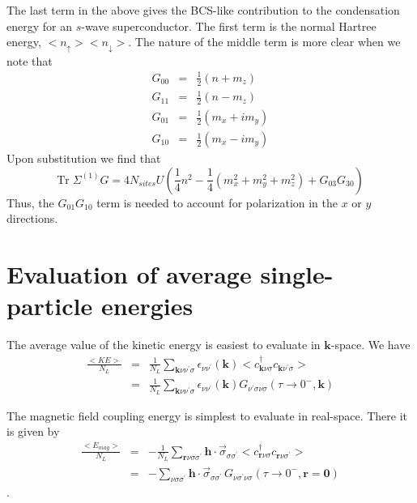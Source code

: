 The last term in the above gives the BCS-like contribution to
the condensation energy for an $s$-wave superconductor.  The 
first term is the normal Hartree energy, $<n_{\uparrow}><n_{\downarrow}>$.
The nature of the middle term is more clear when we note that
\begin{eqnarray}
G_{00} & = & \frac{1}{2}( n + m_z) \\
G_{11} & = & \frac{1}{2}( n - m_z) \\
G_{01} & = & \frac{1}{2}( m_x + i m_y) \\
G_{10} & = & \frac{1}{2}( m_x - i m_y)
\end{eqnarray}
Upon substitution we find that
\begin{equation}
\mathrm{Tr}\; \Sigma^{(1)} G = 4 N_{sites} U 
\left( \frac{1}{4} n^2 - \frac{1}{4}(m_x^2 + m_y^2 + m_z^2)
+ G_{03}G_{30} \right)
\end{equation}
Thus, the $G_{01}G_{10}$ term is needed to account for
polarization in the $x$ or $y$ directions.

\section{Evaluation of average single-particle energies}

The average value of the kinetic energy is easiest
to evaluate in $\mathbf{k}$-space.  We have
\begin{eqnarray}
\frac{<KE>}{N_L} & = & \frac{1}{N_L}
\sum_{\mathbf{k}\nu\nu^{\prime}\sigma} \epsilon_{\nu\nu^{\prime}}(\mathbf{k}) 
<c^{\dagger}_{\mathbf{k}\nu\sigma} c_{\mathbf{k}\nu^{\prime}\sigma}>
\\
& = & \frac{1}{N_L} \sum_{\mathbf{k}\nu\nu^{\prime}\sigma} 
\epsilon_{\nu\nu^{\prime}}(\mathbf{k}) 
G_{\nu^{\prime}\sigma \nu\sigma}(\tau \to 0^-, \mathbf{k}) 
\end{eqnarray}

The magnetic field coupling energy is simplest to evaluate
in real-space.  There it is given by
\begin{eqnarray}
\frac{<E_{mag}>}{N_L} & = & - \frac{1}{N_L} 
\sum_{\mathbf{r}\nu\sigma\sigma^{\prime}} \mathbf{h}\cdot 
\vec{\sigma}_{\sigma\sigma^{\prime}}
 <c^{\dagger}_{\mathbf{r}\nu\sigma} c_{\mathbf{r}\nu\sigma^{\prime}}>
 \\
& = & - \sum_{\nu\sigma\sigma^{\prime}} 
\mathbf{h}\cdot\vec{\sigma}_{\sigma\sigma^{\prime}}\,
G_{\nu\sigma^{\prime}\nu\sigma}(\tau \to 0^-,\mathbf{r} = \mathbf{0}) 
\end{eqnarray}.

